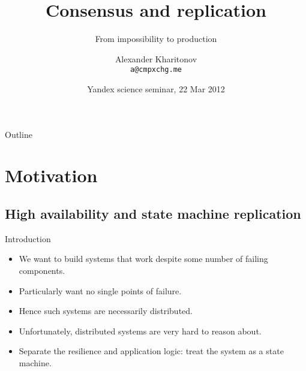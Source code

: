\documentclass{beamer}
\title%
{Consensus and replication}
\subtitle
{From impossibility to production}
\author[Alexander Kharitonov]{Alexander Kharitonov \\ \texttt{a@cmpxchg.me}}
\date{Yandex science seminar, 22 Mar 2012}
\begin{document}
\begin{frame}
  \titlepage
\end{frame}

\begin{frame}{Outline}
  \tableofcontents
\end{frame}





\section{Motivation}
\subsection{High availability and state machine replication}

\begin{frame}{Introduction}
  \begin{itemize}
  \item We want to build systems that work despite some number of failing components.
  \item Particularly want no single points of failure.
  \item Hence such systems are necessarily distributed.
  \item Unfortunately, distributed systems are very hard to reason about.
  \item Separate the resilience and application logic: treat the system as a state machine.
  \end{itemize}
\end{frame}
\end{document}

